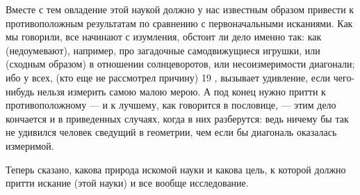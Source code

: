 \documentclass{article}
\begin{document}
Вместе с тем овладение этой наукой должно у нас известным образом привести к противоположным результатам по сравнению с первоначальными исканиями. Как мы говорили, все начинают с изумления, обстоит ли дело именно так: как (недоумевают), например, про загадочные самодвижущиеся игрушки, или (сходным образом) в отношении солнцеворотов, или несоизмеримости диагонали; ибо у всех, (кто еще не рассмотрел причину)  19 , вызывает удивление, если чего-нибудь нельзя измерить самою малою мерою. А под конец нужно притти к противоположному --- и к лучшему, как говорится в пословице, --- этим дело кончается и в приведенных случаях, когда в них разберутся: ведь ничему бы так не удивился человек сведущий в геометрии, чем если бы диагональ оказалась измеримой.

Теперь сказано, какова природа искомой науки и какова цель, к которой должно притти искание (этой науки) и все вообще исследование.
\end{document}
